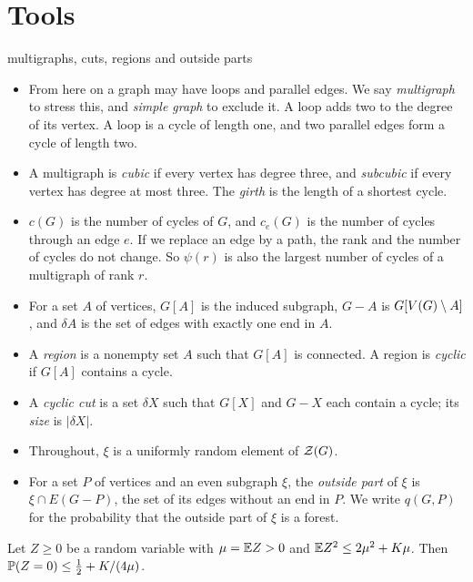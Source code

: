 \section{Tools}\label{sec:tools}

\begin{notation}{multigraphs, cuts, regions and outside parts}
\begin{itemize}[leftmargin=1.2em]
\item From here on a graph may have loops and parallel edges. We say \emph{multigraph} to stress
this, and \emph{simple graph} to exclude it. A loop adds two to the degree of its vertex. A loop is
a cycle of length one, and two parallel edges form a cycle of length two.
\item A multigraph is \emph{cubic} if every vertex has degree three, and \emph{subcubic} if every
vertex has degree at most three. The \emph{girth} is the length of a shortest cycle.
\item $c(G)$ is the number of cycles of $G$, and $c_e(G)$ is the number of cycles through an edge
$e$. If we replace an edge by a path, the rank and the number of cycles do not change. So
$\psi(r)$ is also the largest number of cycles of a multigraph of rank $r$.
\item For a set $A$ of vertices, $G[A]$ is the induced subgraph, $G-A$ is $G[V(G)\setminus A]$, and
$\delta A$ is the set of edges with exactly one end in $A$.
\item A \emph{region} is a nonempty set $A$ such that $G[A]$ is connected. A region is
\emph{cyclic} if $G[A]$ contains a cycle.
\item A \emph{cyclic cut} is a set $\delta X$ such that $G[X]$ and $G-X$ each contain a cycle; its
\emph{size} is $|\delta X|$.
\item Throughout, $\xi$ is a uniformly random element of $\mathcal{Z}(G)$.
\item For a set $P$ of vertices and an even subgraph $\xi$, the \emph{outside part} of $\xi$ is
$\xi\cap E(G-P)$, the set of its edges without an end in $P$. We write $q(G,P)$ for the
probability that the outside part of $\xi$ is a forest.
\end{itemize}
\end{notation}

\begin{lemma}\label{lem:second}
Let $Z\ge0$ be a random variable with $\mu=\mathbb{E} Z>0$ and $\mathbb{E} Z^{2}\le2\mu^{2}+K\mu$. Then
$\mathbb{P}(Z=0)\le\tfrac12+K/(4\mu)$.
\end{lemma}

